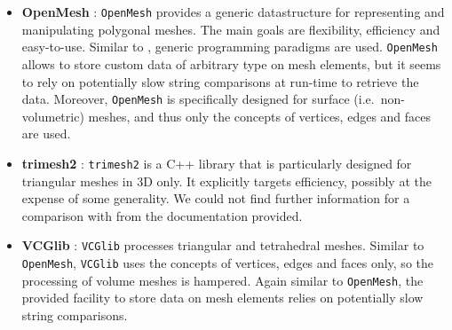 \begin{itemize}
  \item \textbf{OpenMesh} \cite{OpenMesh}: \texttt{OpenMesh} provides a generic datastructure for representing and manipulating polygonal meshes.
        The main goals are flexibility, efficiency and easy-to-use.
        Similar to {\ViennaGrid}, generic programming paradigms are used.
        \texttt{OpenMesh} allows to store custom data of arbitrary type on mesh elements, but it seems to rely on potentially slow string comparisons at run-time to retrieve the data.
        Moreover, \texttt{OpenMesh} is specifically designed for surface (i.e.~non-volumetric) meshes, and thus only the concepts of vertices, edges and faces are used.

  \item \textbf{trimesh2} \cite{trimesh2}: \texttt{trimesh2} is a C++ library that is particularly designed for triangular meshes in 3D only.
        It explicitly targets efficiency, possibly at the expense of some generality.
        We could not find further information for a comparison with {\ViennaGrid} from the documentation provided.

  \item \textbf{VCGlib} \cite{VCGlib}: \texttt{VCGlib} processes triangular and tetrahedral meshes.
        Similar to \texttt{OpenMesh}, \texttt{VCGlib} uses the concepts of vertices, edges and faces only, so the processing of volume meshes is hampered.
        Again similar to \texttt{OpenMesh}, the provided facility to store data on mesh elements relies on potentially slow string comparisons.
\end{itemize}




